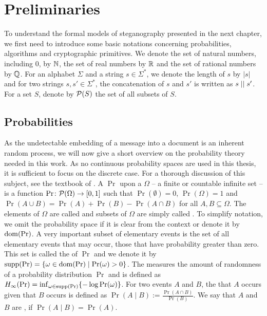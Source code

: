 \chapter{Preliminaries}
To understand the formal models of steganography presented in the next
chapter, we first need to introduce some basic notations concerning
probabilities, algorithms and cryptographic primitives. We denote the
set of natural numbers, including $0$, by $\mathbb{N}$, the set of real
numbers by $\mathbb{R}$ and the set of rational numbers by $\mathbb{Q}$. For an
alphabet $\Sigma$ and a string $s\in \Sigma^{*}$, we denote the length
of $s$ by $|s|$ and for two strings $s,s'\in \Sigma^{*}$, the
concatenation of $s$ and $s'$ is written as $s\mid \mid s'$. For a set
$S$, denote by $\mathcal{P}(S)$ the set of all subsets of $S$. 



\section{Probabilities}
As the undetectable embedding of a message into a document is an
inherent random process, we will now give a short overview on the
probability theory needed in this work. As no continuous probability
spaces are used in this thesis, it is sufficient to focus on the
discrete case. For a thorough discussion of this subject, see \eg the
textbook of \citeauthor{mitzenmacher2005probability}
\cite{mitzenmacher2005probability}. A
 $\Pr$ upon a 
$\Omega$ -- a finite or countable infinite set -- is a function
$\Pr\colon\mathcal{P}(\Omega)\to [0,1]$ such that $\Pr(\emptyset)=0$,
$\Pr(\Omega)=1$ and $\Pr(A\cup B)=\Pr(A)+\Pr(B)-\Pr(A\cap B)$ for all
$A,B\subseteq \Omega$. The elements of $\Omega$ are called
 and subsets of $\Omega$ are simply called
. To simplify notation, we omit the probability space if
it is clear from the context or denote it by $\operatorname{dom}(\Pr)$. A very
important subset of elementary events is the set of all elementary
events that may occur, \ie those that have probability greater than
zero. This set is called the  of $\Pr$ and we denote it
by $\operatorname{supp}(\Pr)=\{\omega\in \operatorname{dom}(\Pr)\mid \Pr(\omega) > 0\}$. The
 measures the amount of randomness of a probability
distribution $\Pr$ and is defined as
$H_{\infty}(\Pr)=\inf_{\omega\in \operatorname{supp}(\Pr)}\{-\log \Pr(\omega)\}$. For two
events $A$ and $B$, the  that $A$ occurs
given that $B$ occurs is defined as
$\Pr(A\mid B) := \frac{\Pr(A\cap B)}{\Pr(B)}$. We say that $A$ and $B$
are , if $\Pr(A\mid B)=\Pr(A)$.


